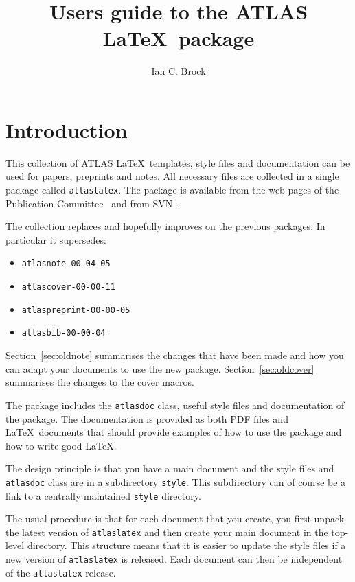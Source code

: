 \documentclass[koma,UKenglish]{style/atlasdoc}
\title{Users guide to the ATLAS \LaTeX\ package}
\author{Ian C. Brock}
\affil{University of Bonn}
\begin{document}
\tableofcontents
\clearpage

\section{Introduction}
\label{sec:intro}

This collection of ATLAS \LaTeX\ templates, style files and documentation
can be used for papers, preprints and notes. 
All necessary files are collected in a single package called \texttt{atlaslatex}.
The package is available from the web pages of the Publication Committee~\cite{pubcom} and from 
SVN~\cite{pubcom-svn}.

The collection replaces and hopefully improves on the previous packages. 
In particular it supersedes:
\begin{itemize}\setlength{\parskip}{0pt}\setlength{\itemsep}{0pt}
\item \texttt{atlasnote-00-04-05}
\item \texttt{atlascover-00-00-11}
\item \texttt{atlaspreprint-00-00-05}
\item \texttt{atlasbib-00-00-04}
\end{itemize}
Section~\ref{sec:oldnote} summarises the changes that have been made and
how you can adapt your documents to use the new package.
Section~\ref{sec:oldcover} summarises the changes to the cover macros.

The package includes the \texttt{atlasdoc} class, useful style files
and documentation of the package.
The documentation is provided as both PDF files and \LaTeX\ documents
that should provide examples of how to use the package and how to write
good \LaTeX.

The design principle is that you have a main document and 
the style files and \texttt{atlasdoc} class are in a subdirectory \texttt{style}.
This subdirectory can of course be a link to a centrally maintained \texttt{style} directory.

The usual procedure is that for each document that you create,
you first unpack the latest version of \texttt{atlaslatex} and
then create your main document in the top-level directory.
This structure means that it is easier to update the style files if a new version of
\texttt{atlaslatex} is released. 
Each document can then be independent of the \texttt{atlaslatex} release.
\end{document}
